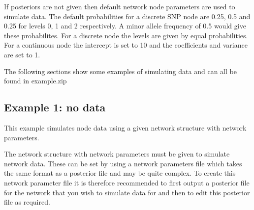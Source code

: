 \documentclass[a4paper,12pt]{article}
\begin{document}


If posteriors are not given then default network node parameters are used to simulate data. The default probabilities for a discrete SNP node are 0.25, 0.5 and 0.25 for levels 0, 1 and 2 respectively. A minor allele frequency of 0.5 would give these probabilites. For a discrete node the levels are given by equal probabilities. For a continuous node the intercept is set to 10 and the coefficients and variance are set to 1. 

The following sections show some examples of simulating data and can all be found in example.zip
\subsection{Example 1: no data}
\label{sim-data-example1}

This example simulates node data using a given network structure with network parameters. 

The network structure with network parameters must be given to simulate network data. These can be set by using a network parameters file which takes the same format as a posterior file and may be quite complex. To create this network parameter file it is therefore recommended to first output a posterior file for the network that you wish to simulate data for and then to edit this posterior file as required. 
\end{document}
